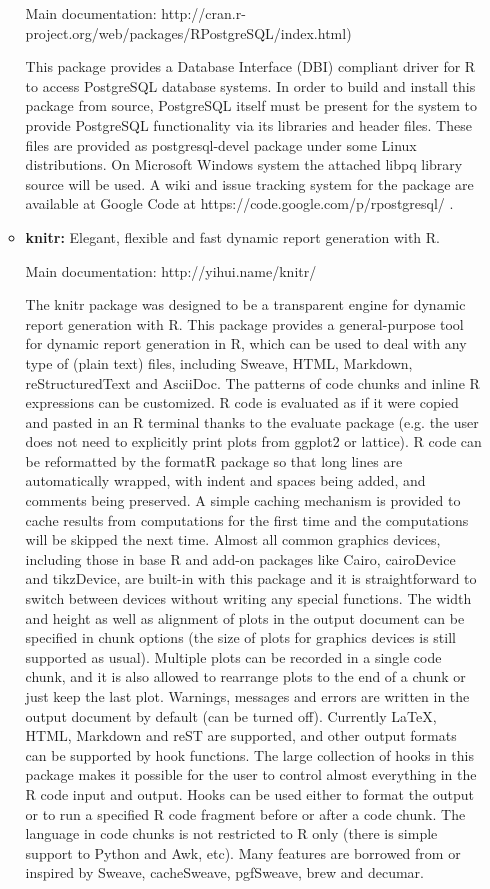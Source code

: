 \documentclass[12pt,letterpaper]{report}
\begin{document}
\begin{itemize}
\begin{itemize}
Main documentation: http://cran.r-project.org/web/packages/RPostgreSQL/index.html)

This package provides a Database Interface (DBI) compliant driver for R to access PostgreSQL database systems. In order to build and install this package from source, PostgreSQL itself must be present for the system to provide PostgreSQL functionality via its libraries and header files. These files are provided as postgresql-devel package under some Linux distributions. On Microsoft Windows system the attached libpq library source will be used. A wiki and issue tracking system for the package are available at Google Code at https://code.google.com/p/rpostgresql/ . 

\item \textbf{knitr:} Elegant, flexible and fast dynamic report generation with R. \cite{xie2013knitr}

Main documentation: http://yihui.name/knitr/

The knitr package was designed to be a transparent engine for dynamic report generation with R. This package provides a general-purpose tool for dynamic report generation in R, which can be used to deal with any type of (plain text) files, including Sweave, HTML, Markdown, reStructuredText and AsciiDoc. The patterns of code chunks and inline R expressions can be customized. R code is evaluated as if it were copied and pasted in an R terminal thanks to the evaluate package (e.g. the user does not need to explicitly print plots from ggplot2 or lattice). R code can be reformatted by the formatR package so that long lines are automatically wrapped, with indent and spaces being added, and comments being preserved. A simple caching mechanism is provided to cache results from computations for the first time and the computations will be skipped the next time. Almost all common graphics devices, including those in base R and add-on packages like Cairo, cairoDevice and tikzDevice, are built-in with this package and it is straightforward to switch between devices without writing any special functions. The width and height as well as alignment of plots in the output document can be specified in chunk options (the size of plots for graphics devices is still supported as usual). Multiple plots can be recorded in a single code chunk, and it is also allowed to rearrange plots to the end of a chunk or just keep the last plot. Warnings, messages and errors are written in the output document by default (can be turned off). Currently LaTeX, HTML, Markdown and reST are supported, and other output formats can be supported by hook functions. The large collection of hooks in this package makes it possible for the user to control almost everything in the R code input and output. Hooks can be used either to format the output or to run a specified R code fragment before or after a code chunk. The language in code chunks is not restricted to R only (there is simple support to Python and Awk, etc). Many features are borrowed from or inspired by Sweave, cacheSweave, pgfSweave, brew and decumar.  
\end{itemize}


\end{itemize}
\end{document}
